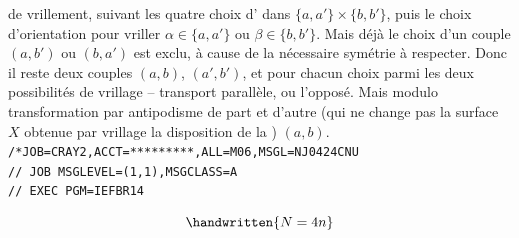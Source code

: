 de vrillement, suivant les  quatre choix d' dans $\{a,a'\}\mathbin{\times}\{b,b'\}$, puis le choix d'orientation pour vriller $\alpha\in\{a,a'\}$ ou $\beta\in\{b,b'\}$. Mais déjà le choix d'un couple $(a,b')$ ou $(b,a')$ est exclu, à cause de la nécessaire symétrie à respecter. Donc il reste deux couples $(a,b)$, $(a',b')$, et pour chacun choix parmi les deux possibilités de vrillage -- transport parallèle, ou l'opposé. Mais modulo  transformation par antipodisme de part et d'autre (qui ne change pas la surface $X$ obtenue par vrillage  la disposition de la )  $(a,b)$.
\noindent\texttt{/*JOB=CRAY2,ACCT=*********,ALL=M06,MSGL=N}\hfill\texttt{J0424CNU}\\
\texttt{// JOB MSGLEVEL=(1,1),MSGCLASS=A}\\
\texttt{// EXEC PGM=IEFBR14}

\[\handwritten{N=4n}\]

